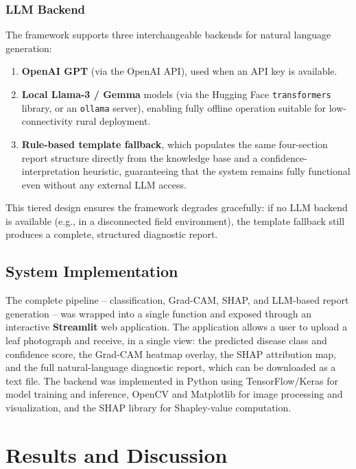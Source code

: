 \documentclass[12pt,a4paper,oneside]{report}
\begin{document}
\subsection{LLM Backend}
The framework supports three interchangeable backends for natural language generation:
\begin{enumerate}
    \item \textbf{OpenAI GPT} (via the OpenAI API), used when an API key is available.
    \item \textbf{Local Llama-3 / Gemma} models (via the Hugging Face \texttt{transformers} library, or an
          \texttt{ollama} server), enabling fully offline operation suitable for low-connectivity rural
          deployment.
    \item \textbf{Rule-based template fallback}, which populates the same four-section report structure directly
          from the knowledge base and a confidence-interpretation heuristic, guaranteeing that the system remains
          fully functional even without any external LLM access.
\end{enumerate}
This tiered design ensures the framework degrades gracefully: if no LLM backend is available (e.g., in a
disconnected field environment), the template fallback still produces a complete, structured diagnostic report.

\section{System Implementation}
The complete pipeline -- classification, Grad-CAM, SHAP, and LLM-based report generation -- was wrapped into a
single function and exposed through an interactive \textbf{Streamlit} web application. The application allows a
user to upload a leaf photograph and receive, in a single view: the predicted disease class and confidence score,
the Grad-CAM heatmap overlay, the SHAP attribution map, and the full natural-language diagnostic report, which can
be downloaded as a text file. The backend was implemented in Python using TensorFlow/Keras for model training and
inference, OpenCV and Matplotlib for image processing and visualization, and the SHAP library for Shapley-value
computation.

\chapter{Results and Discussion}
\label{ch:results}
\end{document}
